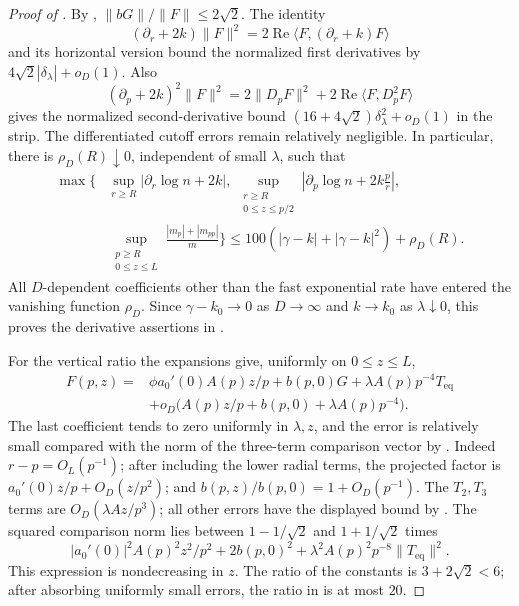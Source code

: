 \begin{proof}[Proof of ]
By , \(\|bG\|/\|F\|\leq2\sqrt2\).
The identity
\[
 (\partial_r+2k)\|F\|^2
 =2\operatorname{Re}\langle F,(\partial_r+k)F\rangle
 \]
and its horizontal version bound the normalized first derivatives
by \(4\sqrt2|\delta_\lambda|+o_D(1)\).
Also
\[
 (\partial_p+2k)^2\|F\|^2
 =2\|D_pF\|^2+
  2\operatorname{Re}\langle F,D_p^2F\rangle
 \]
gives the normalized second-derivative bound
\((16+4\sqrt2)\delta_\lambda^2+o_D(1)\) in the strip.
The differentiated cutoff errors remain relatively negligible.
In particular, there is \(\rho_D(R)\downarrow0\), independent
of small \(\lambda\), such that
\begin{equation}
 \begin{split}
 \max\Bigg\{&
 \sup_{r\geq R}|\partial_r\log n+2k|,\ 
 \sup_{\substack{r\geq R\\0\leq z\leq p/2}}
       \left|\partial_p\log n+2k\frac p r\right|,\\
 &\sup_{\substack{p\geq R\\0\leq z\leq L}}
       \frac{|m_p|+|m_{pp}|}{m}\Bigg\}
 \leq100(|\gamma-k|+|\gamma-k|^2)+\rho_D(R).
 \end{split}
 \label{eq:quantitative-density-drift}
\end{equation}
All \(D\)-dependent coefficients other than the fast exponential
rate have entered the vanishing function \(\rho_D\).
Since \(\gamma-k_0\to0\) as \(D\to\infty\) and \(k\to k_0\)
as \(\lambda\downarrow0\), this proves the derivative assertions
in \Cref{eq:density-drift,eq:strip-data}.

For the vertical ratio the expansions give, uniformly on
\(0\leq z\leq L\),
\begin{equation}
 \begin{split}
 F(p,z)={}&\phi a_0'(0)A(p)z/p+b(p,0)G
               +\lambda A(p)p^{-4}T_{\mathrm{eq}}\\
 &+o_D\bigl(A(p)z/p+b(p,0)+\lambda A(p)p^{-4}\bigr).
 \end{split}
 \label{eq:strip-comparison-vector}
\end{equation}
The last coefficient tends to zero uniformly in \(\lambda,z\),
and the error is relatively small compared with the norm of
the three-term comparison vector by
.
Indeed \(r-p=O_L(p^{-1})\); after including the lower radial terms,
the projected factor is \(a_0'(0)z/p+O_D(z/p^2)\);
and \(b(p,z)/b(p,0)=1+O_D(p^{-1})\).
The \(T_2,T_3\) terms are \(O_D(\lambda A z/p^3)\);
all other errors have the displayed bound by
.
The squared comparison norm lies between \(1-1/\sqrt2\) and
\(1+1/\sqrt2\) times
\[
 |a_0'(0)|^2A(p)^2z^2/p^2+
 2b(p,0)^2+\lambda^2A(p)^2p^{-8}\|T_{\mathrm{eq}}\|^2.
 \]
This expression is nondecreasing in \(z\).
The ratio of the constants is \(3+2\sqrt2<6\);
after absorbing uniformly small errors, the ratio in
 is at most \(20\).


\end{proof}
